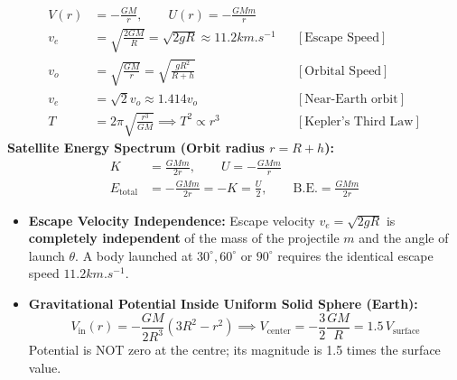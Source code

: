\documentclass[10pt,twoside,openright]{book}
\begin{document}
\begin{formulabox}
\begin{align}
  V(r) &= -\frac{GM}{r}, \qquad U(r) = -\frac{GMm}{r} \\
  v_e &= \sqrt{\frac{2GM}{R}} = \sqrt{2gR} \approx 11.2\si{km.s^{-1}} && [\text{Escape Speed}] \\
  v_o &= \sqrt{\frac{GM}{r}} = \sqrt{\frac{g R^2}{R+h}} && [\text{Orbital Speed}] \\
  v_e &= \sqrt{2} v_o \approx 1.414 v_o && [\text{Near-Earth orbit}] \\
  T &= 2\pi\sqrt{\frac{r^3}{GM}} \implies T^2 \propto r^3 && [\text{Kepler's Third Law}]
\end{align}
\textbf{Satellite Energy Spectrum (Orbit radius $r = R+h$):}
\begin{align}
  K &= \frac{GMm}{2r}, \qquad U = -\frac{GMm}{r} \\
  E_{\text{total}} &= -\frac{GMm}{2r} = -K = \frac{U}{2}, \qquad \text{B.E.} = \frac{GMm}{2r}
\end{align}
\end{formulabox}

\begin{trapbox}
\begin{itemize}
  \item \textbf{Escape Velocity Independence:} Escape velocity $v_e = \sqrt{2gR}$ is \textbf{completely independent} of the mass of the projectile $m$ and the angle of launch $\theta$. A body launched at $30^\circ, 60^\circ$ or $90^\circ$ requires the identical escape speed $11.2\si{km.s^{-1}}$.
  \item \textbf{Gravitational Potential Inside Uniform Solid Sphere (Earth):}
  \begin{equation*}
    V_{\text{in}}(r) = -\frac{GM}{2R^3}\left(3R^2 - r^2\right) \implies V_{\text{center}} = -\frac{3}{2}\frac{GM}{R} = 1.5\,V_{\text{surface}}
  \end{equation*}
  Potential is NOT zero at the centre; its magnitude is 1.5 times the surface value.
\end{itemize}
\end{trapbox}

\newpage

\end{document}
